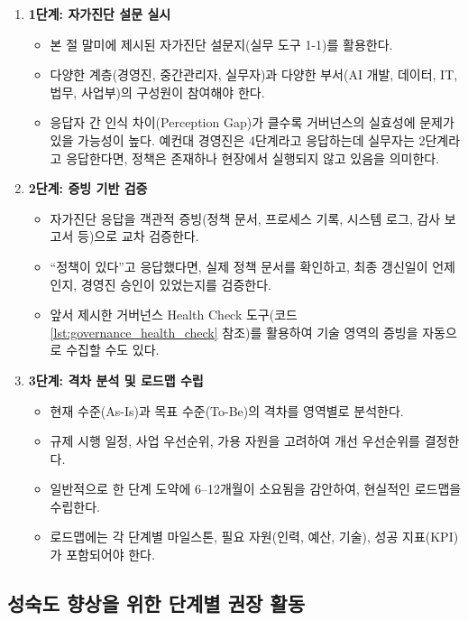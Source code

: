 \begin{enumerate}
    \item \textbf{1단계: 자가진단 설문 실시}
    \begin{itemize}
        \item 본 절 말미에 제시된 자가진단 설문지(실무 도구 1-1)를 활용한다.
        \item 다양한 계층(경영진, 중간관리자, 실무자)과 다양한 부서(AI 개발, 데이터, IT, 법무, 사업부)의 구성원이 참여해야 한다.
        \item 응답자 간 인식 차이(Perception Gap)가 클수록 거버넌스의 실효성에 문제가 있을 가능성이 높다. 예컨대 경영진은 4단계라고 응답하는데 실무자는 2단계라고 응답한다면, 정책은 존재하나 현장에서 실행되지 않고 있음을 의미한다.
    \end{itemize}
    \item \textbf{2단계: 증빙 기반 검증}
    \begin{itemize}
        \item 자가진단 응답을 객관적 증빙(정책 문서, 프로세스 기록, 시스템 로그, 감사 보고서 등)으로 교차 검증한다.
        \item ``정책이 있다''고 응답했다면, 실제 정책 문서를 확인하고, 최종 갱신일이 언제인지, 경영진 승인이 있었는지를 검증한다.
        \item 앞서 제시한 거버넌스 Health Check 도구(코드 \ref{lst:governance_health_check} 참조)를 활용하여 기술 영역의 증빙을 자동으로 수집할 수도 있다.
    \end{itemize}
    \item \textbf{3단계: 격차 분석 및 로드맵 수립}
    \begin{itemize}
        \item 현재 수준(As-Is)과 목표 수준(To-Be)의 격차를 영역별로 분석한다.
        \item 규제 시행 일정, 사업 우선순위, 가용 자원을 고려하여 개선 우선순위를 결정한다.
        \item 일반적으로 한 단계 도약에 6--12개월이 소요됨을 감안하여, 현실적인 로드맵을 수립한다.
        \item 로드맵에는 각 단계별 마일스톤, 필요 자원(인력, 예산, 기술), 성공 지표(KPI)가 포함되어야 한다.
    \end{itemize}
\end{enumerate}

\subsection{성숙도 향상을 위한 단계별 권장 활동}

